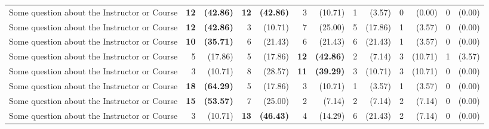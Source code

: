 \documentclass[12pt, oneside, landscape]{memoir}
\newcommand{\myrowcolour}{\rowcolor[gray]{0.925}}
\newcommand{\highest}[1]{\textbf{#1}}%
\newcommand{\highest}[1]{\textcolor{Maroon}{\textbf{#1}}}%
\begin{document}
\begin{longtable}{@{}l rr rr rr rr rr rr}
		Some question about the Instructor or Course & \highest{12} &
		\highest{(42.86)} & \highest{12} & \highest{(42.86)} & 3
		& (10.71) & 1 & (3.57) & 0 & (0.00) & 0 & (0.00) \\
		
		\myrowcolour%
		Some question about the Instructor or Course & \highest{12} &
		\highest{(42.86)} & 3 & (10.71) & 7
		& (25.00) & 5 & (17.86) & 1 & (3.57) & 0 & (0.00) \\
		
		Some question about the Instructor or Course & \highest{10} &
		\highest{(35.71)} & 6 & (21.43) & 6 & (21.43) & 6 & (21.43)
		& 1 & (3.57) & 0 & (0.00) \\
		
		\myrowcolour%
		Some question about the Instructor or Course & 5 & (17.86) & 5 &
		(17.86) & \highest{12} & \highest{(42.86)} & 2 & (7.14)
		& 3 & (10.71) & 1 & (3.57)\\
		
		Some question about the Instructor or Course & 3 & (10.71) & 8 &
		(28.57) & \highest{11} & \highest{(39.29)} & 3 & (10.71) & 3 & (10.71)
		& 0 & (0.00) \\
		
		\myrowcolour%
		Some question about the Instructor or Course & \highest{18} &
		\highest{(64.29)}
		& 5 & (17.86) & 3 & (10.71) & 1 & (3.57) & 1 & (3.57) & 0 & (0.00) \\
		
		Some question about the Instructor or Course & \highest{15} &
		\highest{(53.57)}
		& 7 & (25.00) & 2 & (7.14) & 2 & (7.14) & 2 & (7.14) & 0 & (0.00) \\
		
		\myrowcolour%
		Some question about the Instructor or Course & 3 & (10.71) &
		\highest{13} & \highest{(46.43)} & 4 & (14.29) & 6 & (21.43) & 2
		& (7.14) & 0 & (0.00) \\
		
		\bottomrule
		
	\end{longtable}
	
\end{document}
